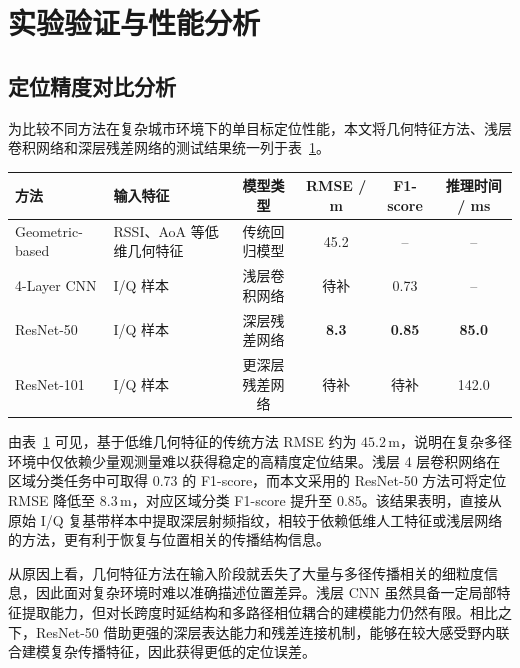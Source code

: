 \section{实验验证与性能分析}
\label{sec:3_6}

\subsection{定位精度对比分析}
\label{subsec:3_6_1}

为比较不同方法在复杂城市环境下的单目标定位性能，本文将几何特征方法、浅层卷积网络和深层残差网络的测试结果统一列于表~\ref{tab:perf_comparison_ch3}。

\begin{table}[htbp]
    \centering
    \label{tab:perf_comparison_ch3}
    \begin{tabular}{@{}llcccc@{}}
        \toprule
        \textbf{方法} & \textbf{输入特征} & \textbf{模型类型} & \textbf{RMSE / m} & \textbf{F1-score} & \textbf{推理时间 / ms} \\ \midrule
        Geometric-based & RSSI、AoA 等低维几何特征 & 传统回归模型 & 45.2 & -- & -- \\
        4-Layer CNN & I/Q 样本 & 浅层卷积网络 & 待补 & 0.73 & -- \\
        ResNet-50 & I/Q 样本 & 深层残差网络 & \textbf{8.3} & \textbf{0.85} & \textbf{85.0} \\
        ResNet-101 & I/Q 样本 & 更深层残差网络 & 待补 & 待补 & 142.0 \\ \bottomrule
    \end{tabular}
\end{table}

由表~\ref{tab:perf_comparison_ch3} 可见，基于低维几何特征的传统方法 RMSE 约为 \(45.2\,\mathrm{m}\)，说明在复杂多径环境中仅依赖少量观测量难以获得稳定的高精度定位结果。浅层 4 层卷积网络在区域分类任务中可取得 0.73 的 F1-score，而本文采用的 ResNet-50 方法可将定位 RMSE 降低至 \(8.3\,\mathrm{m}\)，对应区域分类 F1-score 提升至 0.85。该结果表明，直接从原始 I/Q 复基带样本中提取深层射频指纹，相较于依赖低维人工特征或浅层网络的方法，更有利于恢复与位置相关的传播结构信息。

从原因上看，几何特征方法在输入阶段就丢失了大量与多径传播相关的细粒度信息，因此面对复杂环境时难以准确描述位置差异。浅层 CNN 虽然具备一定局部特征提取能力，但对长跨度时延结构和多路径相位耦合的建模能力仍然有限。相比之下，ResNet-50 借助更强的深层表达能力和残差连接机制，能够在较大感受野内联合建模复杂传播特征，因此获得更低的定位误差。

